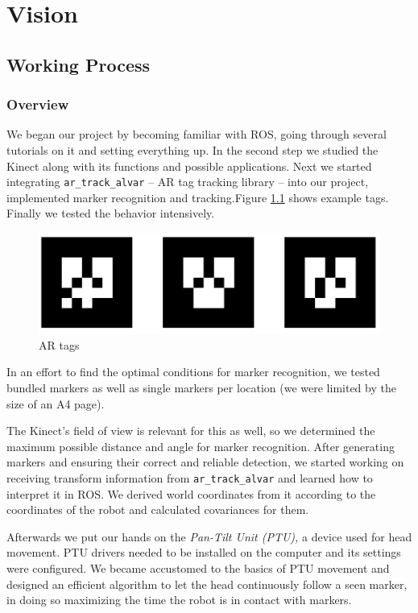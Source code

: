 \chapter{Vision}
\label{Vision chapter}
\section{Working Process}
\subsection{Overview}

We began our project by becoming familiar with ROS, going through  several tutorials on it and setting everything up. In the second step we studied the Kinect along with its functions and possible applications. Next we started integrating \texttt{ar\_track\_alvar} -- AR tag tracking library -- into our project, implemented marker recognition and tracking.Figure \ref{AR tags} shows example tags. Finally we tested the behavior intensively. \\
\begin{figure}
\begin{center}
\includegraphics[width=\linewidth]{graphics/markers.png}
\caption{AR tags}
\label{AR tags}
\end{center}
\end{figure}
In an effort to find the optimal conditions for marker recognition, we tested bundled markers as well as single markers per location (we were limited by the size of an A4 page).

The Kinect's field of view is relevant for this as well, so we determined the maximum possible distance and angle for marker recognition. After generating markers and ensuring their correct and reliable detection, we started working on receiving transform information from \texttt{ar\_track\_alvar} and learned how to interpret it in ROS. We derived world coordinates from it according to the coordinates of the robot and calculated covariances for them.

Afterwards we put our hands on the \textit{Pan-Tilt Unit (PTU),} a device used for head movement. PTU drivers needed to be installed on the computer and its settings were configured. We became accustomed to the basics of PTU movement and designed an efficient algorithm to let the head continuously follow a seen marker, in doing so maximizing the time the robot is in contact with markers.

